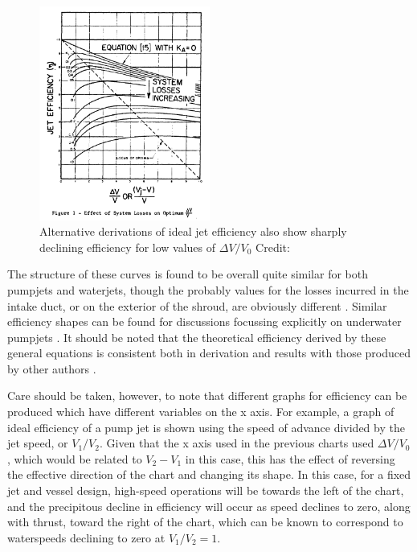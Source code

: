 \documentclass{article}\usepackage[]{graphicx}\usepackage[]{color}
\begin{document}
\begin{figure}[h]
\captionsetup{width=0.5\textwidth}
\includegraphics[width=0.5\textwidth, center]{EfficiencyBrandau.png}
\caption{Alternative derivations of ideal jet efficiency also show sharply declining efficiency for low values of $\Delta V / V_0$ Credit: \cite{brandau1967}}
\label{fig:EfficiencyBrandau.png}
\end{figure}

The structure of these curves is found to be overall quite similar for both pumpjets and waterjets, though the probably values for the losses incurred in the intake duct, or on the exterior of the shroud, are obviously different \parencite[13-14]{wislicenus1973}.  Similar efficiency shapes can be found for discussions focussing explicitly on underwater pumpjets \parencite[13]{henderson1964}. It should be noted that the theoretical efficiency derived by these general equations is consistent both in derivation and results with those produced by other authors \parencite[227]{lewis1988}.

Care should be taken, however, to note that different graphs for efficiency can be produced which have different variables on the x axis.  For example, \cite[247]{mollard2011} a graph of ideal efficiency of a pump jet is shown using the speed of advance divided by the jet speed, or $V_1/V_2$.  Given that the x axis used in the previous charts used $\Delta V / V_0$, which would be related to $V_2-V_1$ in this case, this has the effect of reversing the effective direction of the chart and changing its shape. In this case, for a fixed jet and vessel design, high-speed operations will be towards the left of the chart, and the precipitous decline in efficiency will occur as speed declines to zero, along with thrust, toward the right of the chart, which can be known to correspond to waterspeeds declining to zero at $V_1/V_2=1$.
\end{document}
